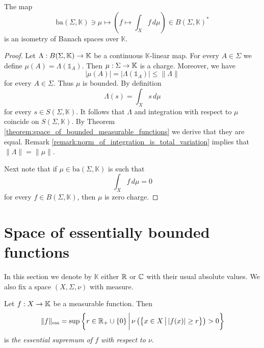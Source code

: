 \begin{theorem}\label{theorem:fichtenholz_kantorovich_for_bounded_functions}
    The map
    $$\mathrm{ba}(\Sigma,\mathbb{K})\ni \mu \mapsto \left(f\mapsto \int_Xf\,d\mu\right) \in B(\Sigma,\mathbb{K})^*$$
    is an isometry of Banach spaces over $\mathbb{K}$.
\end{theorem}
\begin{proof}
    Let $\Lambda:B(\Sigma,\mathbb{K})\rightarrow \mathbb{K}$ be a continuous $\mathbb{K}$-linear map. For every $A \in \Sigma$ we define $\mu(A) = \Lambda(\mathbb{1}_A)$. Then $\mu:\Sigma \rightarrow \mathbb{K}$ is a charge. Moreover, we have
    $$|\mu(A)| = \big|\Lambda(\mathbb{1}_A)\big| \leq \lVert \Lambda \rVert$$
    for every $A \in \Sigma$. Thus $\mu$ is bounded. By definition
    $$\Lambda(s) = \int_Xs\,d\mu$$
    for every $s \in S(\Sigma,\mathbb{K})$. It follows that $\Lambda$ and integration with respect to $\mu$ coincide on $S(\Sigma,\mathbb{K})$. By Theorem \ref{theorem:space_of_bounded_measurable_functions} we derive that they are equal. Remark \ref{remark:norm_of_integration_is_total_variation} implies that $\lVert \Lambda \rVert = \lVert \mu \rVert$.

    Next note that if $\mu \in \mathrm{ba}(\Sigma,\mathbb{K})$ is such that
    $$\int_Xf\,d\mu = 0$$
    for every $f \in B(\Sigma,\mathbb{K})$, then $\mu$ is zero charge.
\end{proof}

\section{Space of essentially bounded functions}
\noindent
In this section we denote by $\mathbb{K}$ either ${\mathbb R}$ or ${\mathbb C}$ with their usual absolute values. We also fix a space $(X,\Sigma,\nu)$ with measure.

\begin{definition}
    Let $f:X\rightarrow \mathbb{K}$ be a measurable function. Then
    $$\lVert f \rVert_{\mathrm{ess}} = \sup \bigg\{r\in {\mathbb R}_+\cup \{0\}\,\bigg|\,\nu\left(\big\{x\in X\,\big|\,|f(x)| \geq r\big\}\right) > 0\bigg\}$$
    is \textit{the essential supremum of $f$ with respect to $\nu$}.
\end{definition}

